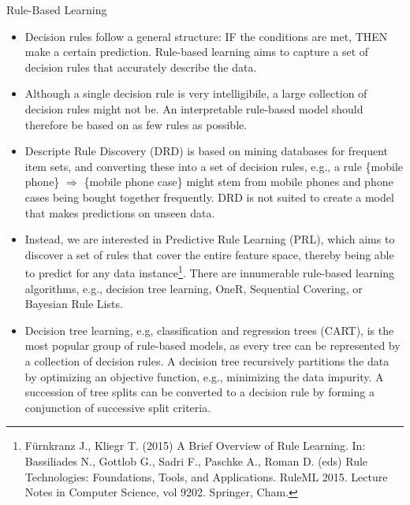 \documentclass[11pt,compress,t,notes=noshow, xcolor=table]{beamer}
\begin{document}
\begin{vbframe}{Rule-Based Learning}

\begin{itemize}
\setlength\itemsep{2em}
\item 
Decision rules follow a general structure: IF the conditions are met, THEN make a certain prediction. Rule-based learning aims to capture a set of decision rules that accurately describe the data. 
\item Although a single decision rule is very intelligibile, a large collection of decision rules might not be. An interpretable rule-based model should therefore be based on as few rules as possible.
\item Descripte Rule Discovery (DRD) is based on mining databases for frequent item sets, and converting these into a set of decision rules, e.g., a rule \{mobile phone\} $\Rightarrow$ \{mobile phone case\} might stem from mobile phones and phone cases being bought together frequently. DRD is not suited to create a model that makes predictions on unseen data.
\item Instead, we are interested in Predictive Rule Learning (PRL), which aims to discover a set of rules that cover the entire feature space, thereby being able to predict for any data instance\footnote[frame]{Fürnkranz J., Kliegr T. (2015) A Brief Overview of Rule Learning. In: Bassiliades N., Gottlob G., Sadri F., Paschke A., Roman D. (eds) Rule Technologies: Foundations, Tools, and Applications. RuleML 2015. Lecture Notes in Computer Science, vol 9202. Springer, Cham.}. There are innumerable rule-based learning algorithms, e.g., decision tree learning, OneR, Sequential Covering, or Bayesian Rule Lists.
\item Decision tree learning, e.g, classification and regression trees (CART), is the most popular group of rule-based models, as every tree can be represented by a collection of decision rules. A decision tree recursively partitions the data by optimizing an objective function, e.g., minimizing the data impurity. A succession of tree splits can be converted to a decision rule by forming a conjunction of successive split criteria.

\end{itemize}
\end{vbframe}
\end{document}
